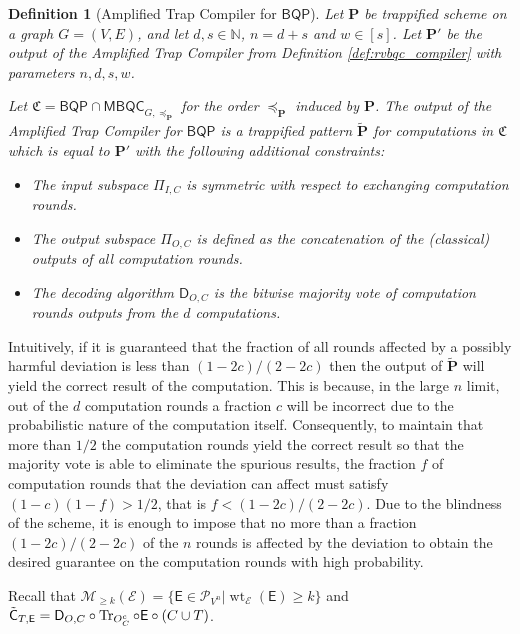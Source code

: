 \documentclass[12pt]{iopart}
\newcommand{\cptp}[1]{\mathsf{#1}} \newcommand{\pd}[1]{\mathcal{#1}}  \newcommand{\sch}[1]{\bm{#1}}
\renewcommand{\1}{\mathds{1}}
\newcommand{\TP}{C\cup T}
\newcommand{\Deco}{\cptp D_{O, C}}
\newcommand{\Cdev}[1]{\tilde{\cptp C}_{T, #1}}
\newtheorem{definition}{Definition}
\begin{document}
\begin{definition}[Amplified Trap Compiler for $\mathsf{BQP}$]
\label{def:rvbqc_bqp_compiler}
Let $\sch P$ be trappified scheme on a graph $G = (V, E)$, and let $d, s \in \mathbb{N}$, $n = d + s$ and $w \in [s]$. Let $\sch P'$ be the output of the Amplified Trap Compiler from Definition \ref{def:rvbqc_compiler} with parameters $n, d, s, w$.

Let $\mathfrak{C} = \mathsf{BQP} \cap \mathsf{MBQC}_{G, \preceq_{\sch P}}$ for the order $\preceq_{\sch P}$ induced by $\sch P$. The output of the Amplified Trap Compiler for $\mathsf{BQP}$ is a trappified pattern $\tilde{\sch P}$ for computations in $\mathfrak{C}$ which is equal to $\sch P'$ with the following additional constraints:
\begin{itemize}
\item The input subspace $\Pi_{I, C}$ is symmetric with respect to exchanging computation rounds.
\item The output subspace $\Pi_{O, C}$ is defined as the concatenation of the (classical) outputs of all computation rounds.
\item The decoding algorithm $\Deco$ is the bitwise majority vote of computation rounds outputs from the $d$ computations.
\end{itemize}
\end{definition}

Intuitively, if it is guaranteed that the fraction of all rounds
affected by a possibly harmful deviation is less than $(1 - 2c)/(2 - 2c)$
then the output of $\tilde{\sch P}$ will yield the correct result of the
computation. This is because, in the large $n$ limit, out of the $d$
computation rounds a fraction $c$ will be incorrect due to the
probabilistic nature of the computation itself. Consequently, to
maintain that more than $1/2$ the computation rounds yield the correct
result so that the majority vote is able to eliminate the spurious
results, the fraction $f$ of computation rounds that the deviation can
affect must satisfy $(1 - c)(1 - f) > 1/2$, that is 
$f < (1 - 2c)/(2 - 2c)$.
Due to the blindness of the scheme, it is enough to impose that no
more than a fraction $(1 - 2c)/(2 - 2c)$ of the $n$ rounds is affected by
the deviation to obtain the desired guarantee on the computation
rounds with high probability.

Recall that $\mathcal{M}_{\geq k}(\mathcal E) = \{\cptp E \in \mathcal P_{V^n} | \operatorname{wt}_{\mathcal E}(\cptp E) \geq k\}$
and $\Cdev{\cptp E} = \Deco\circ\Tr_{O_C^c}\circ\cptp E\circ (\TP)$.
\end{document}
